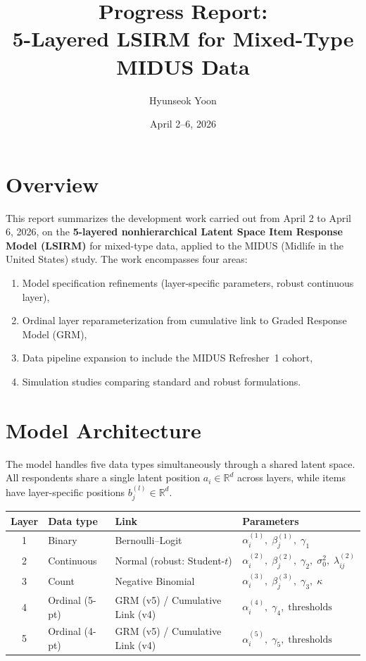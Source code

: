 \documentclass[11pt]{article}
\title{Progress Report:\\5-Layered LSIRM for Mixed-Type MIDUS Data}
\author{Hyunseok Yoon}
\date{April 2--6, 2026}
\begin{document}
\maketitle
\tableofcontents
\newpage

\section{Overview}

This report summarizes the development work carried out from April 2 to April 6, 2026, on the \textbf{5-layered nonhierarchical Latent Space Item Response Model (LSIRM)} for mixed-type data, applied to the MIDUS (Midlife in the United States) study.
The work encompasses four areas:
\begin{enumerate}[label=(\roman*)]
  \item Model specification refinements (layer-specific parameters, robust continuous layer),
  \item Ordinal layer reparameterization from cumulative link to Graded Response Model (GRM),
  \item Data pipeline expansion to include the MIDUS Refresher~1 cohort,
  \item Simulation studies comparing standard and robust formulations.
\end{enumerate}

\section{Model Architecture}

The model handles five data types simultaneously through a shared latent space.
All respondents share a single latent position $a_i \in \mathbb{R}^d$ across layers, while items have layer-specific positions $b_j^{(l)} \in \mathbb{R}^d$.

\begin{center}
\begin{tabular}{clll}
\toprule
Layer & Data type & Link & Parameters \\
\midrule
1 & Binary & Bernoulli--Logit & $\alpha_i^{(1)},\;\beta_j^{(1)},\;\gamma_1$ \\
2 & Continuous & Normal (robust: Student-$t$) & $\alpha_i^{(2)},\;\beta_j^{(2)},\;\gamma_2,\;\sigma_0^2,\;\lambda_{ij}^{(2)}$ \\
3 & Count & Negative Binomial & $\alpha_i^{(3)},\;\beta_j^{(3)},\;\gamma_3,\;\kappa$ \\
4 & Ordinal (5-pt) & GRM (v5) / Cumulative Link (v4) & $\alpha_i^{(4)},\;\gamma_4,\;\text{thresholds}$ \\
5 & Ordinal (4-pt) & GRM (v5) / Cumulative Link (v4) & $\alpha_i^{(5)},\;\gamma_5,\;\text{thresholds}$ \\
\bottomrule
\end{tabular}
\end{center}
\end{document}

